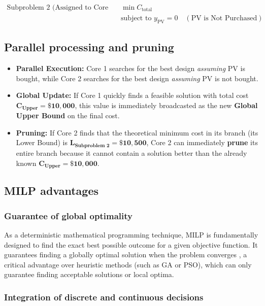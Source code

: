 \documentclass[11pt,a4paper]{report}
\begin{document}
\begin{align*}
    \text{Subproblem 2 (Assigned to Core 2):} \quad & \min C_{\text{total}} \\
    & \text{subject to } y_{\text{PV}} = 0 \quad (\text{PV is Not Purchased})
\end{align*}

\subsection{Parallel processing and pruning}

\begin{itemize}
    \item \textbf{Parallel Execution:} Core 1 searches for the best design \textit{assuming} PV is bought, while Core 2 searches for the best design \textit{assuming} PV is not bought.
    \item \textbf{Global Update:} If Core 1 quickly finds a feasible solution with total cost $\boldsymbol{C_{\text{Upper}} = \$10,000}$, this value is immediately broadcasted as the new \textbf{Global Upper Bound} on the final cost.
    \item \textbf{Pruning:} If Core 2 finds that the theoretical minimum cost in its branch (its Lower Bound) is $\boldsymbol{L_{\text{Subproblem 2}} = \$10,500}$, Core 2 can immediately \textbf{prune} its entire branch because it cannot contain a solution better than the already known $\boldsymbol{C_{\text{Upper}} = \$10,000}$.
\end{itemize}



\subsection{MILP advantages}
\subsubsection{Guarantee of global optimality}

As a deterministic mathematical programming technique, MILP is fundamentally designed to find the exact best possible outcome for a given objective function.
It guarantees finding a globally optimal solution when the problem converges \cite{Urbanucci2018Limits}, a critical advantage over heuristic methods (such as GA or PSO), which can only guarantee finding acceptable solutions or local optima.

\subsubsection{Integration of discrete and continuous decisions}
\end{document}
